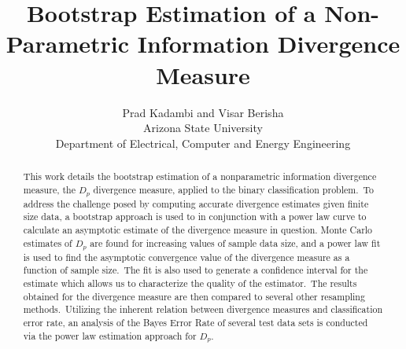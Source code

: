 \documentclass{article}
\begin{document}
	
	\title{Bootstrap Estimation of a Non-Parametric Information Divergence Measure}
	\author { Prad Kadambi and Visar Berisha \\
		\small Arizona State University \\
		\small Department of Electrical, Computer and Energy Engineering}
	\date{}
	\maketitle
	
	\begin{abstract}
		
		This work details the bootstrap estimation of a nonparametric information divergence measure, the $D_p$ divergence measure, applied to the binary classification problem.\ To address the challenge posed by computing accurate divergence estimates given finite size data, a bootstrap approach is used to in conjunction with a power law curve to calculate an asymptotic estimate of the divergence measure in question. Monte Carlo estimates of $D_p$ are found for increasing values of sample data size, and a power law fit is used to find the asymptotic convergence value of the divergence measure as a function of sample size.\ The fit is also used to generate a confidence interval for the estimate which allows us to characterize the quality of the estimator.\ The results obtained for the divergence measure are then compared to several other resampling methods.\  Utilizing the inherent relation between divergence measures and classification error rate, an analysis of the Bayes Error Rate of several test data sets is conducted via the power law estimation approach for $D_p$.
	\end{abstract}
\end{document}
